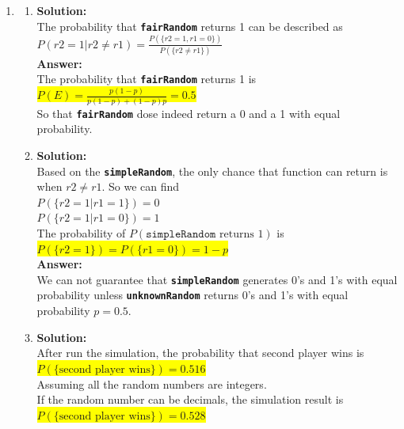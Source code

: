 \documentclass{article}
\newcommand{\myansw}{\textbf{Answer:}\\}
\newcommand{\mysolu}{\textbf{Solution:}\\}
\begin{document}
\begin{enumerate}
\begin{enumerate}
		${P(I)=\frac{6!}{3!}(p_1^3 p_2 p_3 p_4 + p_1 p_2^3 p_3 p_4 + p_1 p_2 p_3^3 p_4+ p_1 p_2 p_3 p_4^3) = 120(p_1^2+p_2^2+p_3^2+p_4^2) p_1 p_2 p_3 p_4}$\\
		\myansw
		\colorbox{yellow}{
		${P(E)=60(6p_5 + 3(p_1 p_2 + p_1 p_3 + p_1 p_4 + p_2 p_3 + p_2 p_4 + p_3 p_4)+2(p_1^2+p_2^2+p_3^2+p_4^2))p_1p_2p_3p_4}$}\\
		\item
		\myansw
		After substitute all the ${p_i}$ values, we can get\\
		\colorbox{yellow}{
			${P(E)=60\times(6\times 0.1 + 3\times 0.2925+2\times 0.225)\times 0.001875=0.2168}$
		}
		
	\end{enumerate}
	\item
	\begin{enumerate}
		\item
		\mysolu
		The probability that \textbf{\texttt{fairRandom}} returns 1 can be described as\\
		${P({r2 = 1|r2\neq r1})=\frac{P(\{r2 = 1, r1 = 0\})}{P(\{r2 \neq r1\})}}$\\
		\myansw
		The probability that \textbf{\texttt{fairRandom}} returns 1 is\\
		\colorbox{yellow}{${P(E)= \frac{p(1-p)}{p(1-p)+(1-p)p}=0.5}$}\\
		So that \textbf{\texttt{fairRandom}} dose indeed return a 0 and a 1 with equal probability.
		\item
		\mysolu
		Based on the \textbf{\texttt{simpleRandom}}, the only chance that function can return is when ${r2 \neq r1}$. So we can find\\
		${P(\{r2 = 1|r1 = 1\})=0}$\\
		${P(\{r2 = 1|r1 = 0\})=1}$\\
		The probability of ${P(\texttt{simpleRandom}\text{ returns 1})}$ is\\
		\colorbox{yellow}{
		${P(\{r2 = 1\})=P(\{r1=0\})=1-p}$}\\
		\myansw
		We can not guarantee that \textbf{\texttt{simpleRandom}} generates 0's and 1's with equal probability unless \textbf{\texttt{unknownRandom}} returns 0's and 1's with equal probability ${p = 0.5}$.
		\item
		\mysolu
		After run the simulation, the probability that second player wins is\\
		\colorbox{yellow}{${P(\{\text{second player wins}\}) = 0.516}$}\\
		Assuming all the random numbers are integers.\\
		If the random number can be decimals, the simulation result is\\
		\colorbox{yellow}{${P(\{\text{second player wins}\}) = 0.528}$}\\
		

\end{enumerate}
\end{enumerate}
\end{document}
